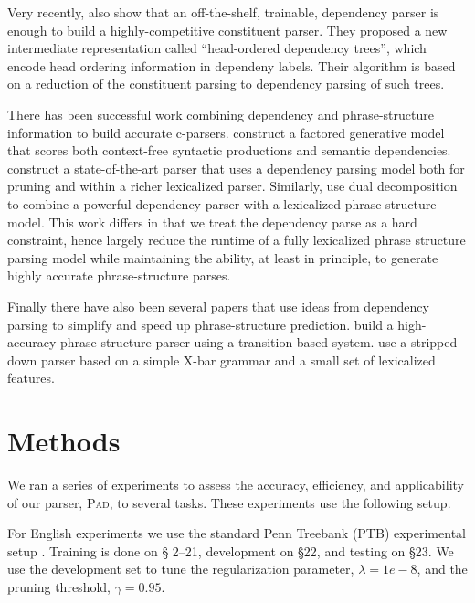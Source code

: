 \documentclass[11pt,letterpaper]{article}
\newcommand{\ParseName}{\textsc{Pad}\xspace}
\begin{document}
 Very recently,  also show that an off-the-shelf,
trainable, dependency parser is enough to build
a highly-competitive constituent parser. They proposed a new intermediate representation called ``head-ordered dependency trees'',
which encode head ordering information in dependeny labels. 
Their algorithm is based on a reduction of the constituent parsing to dependency parsing of such trees.



There has been successful work combining dependency and
phrase-structure information to build accurate c-parsers.
 construct a factored generative model that
scores both context-free syntactic productions and semantic
dependencies.   construct a state-of-the-art
parser that uses a dependency parsing model both for pruning and
within a richer lexicalized parser. Similarly, 
use dual decomposition to combine a powerful dependency parser with a
lexicalized phrase-structure model. This work differs in that we treat the
dependency parse as a hard constraint, hence largely reduce the
runtime of a fully lexicalized phrase structure parsing model
while maintaining the ability, at least in principle, to generate
highly accurate phrase-structure parses.




Finally there have also been several papers that use ideas from
dependency parsing to simplify and speed up phrase-structure prediction.
 build a high-accuracy phrase-structure parser
using a transition-based system.  use a stripped
down parser based on a simple X-bar grammar and a small set of lexicalized features.


\section{Methods}

We ran a series of experiments to assess the accuracy, efficiency,
and applicability of our parser, \ParseName, to several tasks. These experiments
use the following setup.  

For English experiments we use the standard Penn Treebank (PTB)
experimental setup \cite{marcus1993building}. Training is done on \S
2--21, development on \S 22, and testing on \S 23. We use the development set 
to tune the 
regularization parameter, $\lambda=1e-8$, and the pruning threshold, $\gamma=0.95$.
\end{document}
